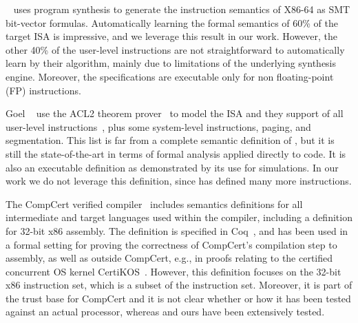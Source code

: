 \Strata~\cite{Heule2016a} uses program synthesis to generate the instruction
semantics of X86-64 as SMT bit-vector formulas. Automatically learning the formal semantics of 60\% of the target \ISA ISA
is impressive, and we leverage this result in our work.  However, the other 40\% of the
user-level instructions are not straightforward to automatically learn by their algorithm, mainly due to limitations of the underlying synthesis engine.  Moreover, the specifications are executable only for non floating-point (FP) instructions.


Goel \etal~\cite{Goel:FMCAD14} use the ACL2 theorem prover~\cite{ACL2:Kaufmann2000} to model the \ISA ISA and they support
\goelPerc{} of all user-level instructions~\cite{GoelList}, plus some system-level instructions, paging, and
segmentation.  This list is far from a complete semantic definition of \ISA,
but it is still the state-of-the-art in terms of formal analysis applied
directly to \ISA code. It is also an executable definition as demonstrated by
its use for simulations. In our work we do not leverage this definition, since
\Strata has defined many more instructions.

The CompCert verified compiler~\cite{Leroy:2009} includes semantics
definitions for all intermediate and target languages used within the compiler,
including a definition for 32-bit x86 assembly. The definition is specified in Coq~\cite{Coq}, and has been used in a formal
setting for proving the correctness of CompCert's compilation step to assembly,
as well as outside CompCert, e.g., in proofs relating to the certified concurrent
OS kernel CertiKOS~\cite{Gu:2016}. However, this definition focuses on the
32-bit x86 instruction set, which is a subset of the \ISA instruction 
set.
Moreover, it is part of the trust base for CompCert and it is not clear
whether or how it has been tested against an actual processor, whereas
\Strata and ours have been extensively tested.

